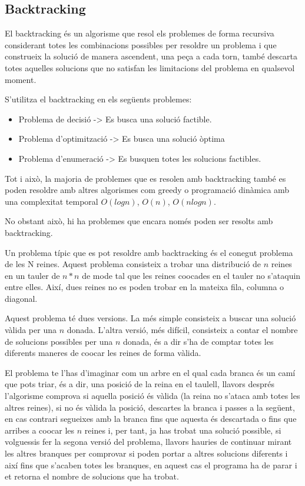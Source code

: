 \subsection{Backtracking}

El backtracking és un algorisme que resol els problemes de forma recursiva considerant totes les combinacions possibles per resoldre un problema i que construeix la solució de manera ascendent, una peça a cada torn, també descarta totes aquelles solucions que no satisfan les limitacions del problema en qualsevol moment.

S'utilitza el backtracking en els següents problemes:

\begin{itemize}
    \item Problema de decisió -> Es busca una solució factible.
    \item Problema d'optimització -> Es busca una solució òptima
    \item Problema d'enumeració -> Es busquen totes les solucions factibles.
\end{itemize}

Tot i això, la majoria de problemes que es resolen amb backtracking també es poden resoldre amb altres algorismes com greedy o programació dinàmica amb una complexitat temporal $O(log n)$, $O(n)$, $O(n log n)$.

No obstant això, hi ha problemes que encara només poden ser resolts amb backtracking.
\newline

Un problema típic que es pot resoldre amb backtracking és el conegut problema de les N reines.
Aquest problema consisteix a trobar una distribució de $n$ reines en un tauler de $n * n$ de mode tal que les reines co\lgem ocades en el tauler no s'ataquin entre elles. Així, dues reines no es poden trobar en la mateixa fila, columna o diagonal.

Aquest problema té dues versions. La més simple consisteix a buscar una solució vàlida per una $n$ donada. L'altra versió, més difícil, consisteix a contar el nombre de solucions possibles per una $n$ donada, és a dir s'ha de comptar totes les diferents maneres de co\lgem ocar les reines de forma vàlida.

El problema te l'has d'imaginar com un arbre en el qual cada branca és un camí que pots triar, és a dir, una posició de la reina en el taulell, llavors després l'algorisme comprova si aquella posició és vàlida (la reina no s'ataca amb totes les altres reines), si no és vàlida la posició, descartes la branca i passes a la següent, en cas contrari segueixes amb la branca fins que aquesta és descartada o fins que arribes a co\lgem ocar les $n$ reines i, per tant, ja has trobat una solució possible, si volguessis fer la segona versió del problema, llavors hauries de continuar mirant les altres branques per comprovar si poden portar a altres solucions diferents i així fins que s'acaben totes les branques, en aquest cas el programa ha de parar i et retorna el nombre de solucions que ha trobat.


